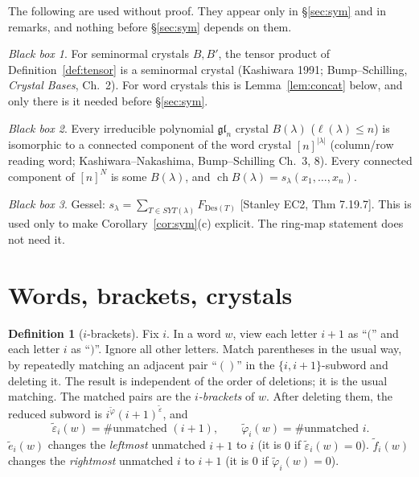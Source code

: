 \documentclass[11pt]{amsart}
\theoremstyle{definition}
\newtheorem{definition}[theorem]{Definition}
\theoremstyle{remark}
\newtheorem{blackbox}{Black box}
\newcommand{\te}{\tilde e}
\newcommand{\tf}{\tilde f}
\newcommand{\teps}{\tilde\varepsilon}
\newcommand{\tphi}{\tilde\varphi}
\begin{document}
The following are used without proof. They appear only in \S\ref{sec:sym} and in remarks, and nothing before \S\ref{sec:sym} depends on them.
\begin{blackbox}\label{bb:tensor}
For seminormal crystals $B,B'$, the tensor product of Definition~\ref{def:tensor} is a seminormal crystal (Kashiwara 1991; Bump--Schilling, \emph{Crystal Bases}, Ch.~2). For word crystals this is Lemma~\ref{lem:concat} below, and only there is it needed before \S\ref{sec:sym}.
\end{blackbox}
\begin{blackbox}\label{bb:Blambda}
Every irreducible polynomial $\mathfrak{gl}_n$ crystal $B(\lambda)$ ($\ell(\lambda)\le n$) is isomorphic to a connected component of the word crystal $[n]^{|\lambda|}$ (column/row reading word; Kashiwara--Nakashima, Bump--Schilling Ch.~3, 8). Every connected component of $[n]^N$ is some $B(\lambda)$, and $\operatorname{ch}B(\lambda)=s_\lambda(x_1,\dots,x_n)$.
\end{blackbox}
\begin{blackbox}\label{bb:gessel}
Gessel: $s_\lambda=\sum_{T\in SYT(\lambda)}F_{\mathrm{Des}(T)}$ [Stanley EC2, Thm 7.19.7]. This is used only to make Corollary~\ref{cor:sym}(c) explicit. The ring-map statement does not need it.
\end{blackbox}

\section{Words, brackets, crystals}

\begin{definition}[$i$-brackets]
Fix $i$. In a word $w$, view each letter $i+1$ as ``$($'' and each letter $i$ as ``$)$''. Ignore all other letters. Match parentheses in the usual way, by repeatedly matching an adjacent pair ``$()$'' in the $\{i,i+1\}$-subword and deleting it. The result is independent of the order of deletions; it is the usual matching. The matched pairs are the \emph{$i$-brackets} of $w$. After deleting them, the reduced subword is $i^{\tphi}(i+1)^{\teps}$, and
\[\teps_i(w)=\#\text{unmatched } (i+1),\qquad \tphi_i(w)=\#\text{unmatched } i .\]
$\te_i(w)$ changes the \emph{leftmost} unmatched $i+1$ to $i$ (it is $0$ if $\teps_i(w)=0$). $\tf_i(w)$ changes the \emph{rightmost} unmatched $i$ to $i+1$ (it is $0$ if $\tphi_i(w)=0$).
\end{definition}
\end{document}
